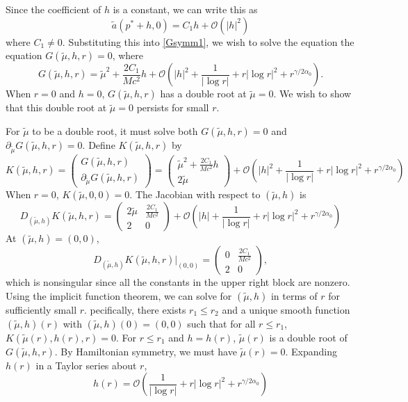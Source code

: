 \documentclass[thesis.tex]{subfiles}
\begin{document}
Since the coefficient of $h$ is a constant, we can write this as
\[
\tilde{a}(p^* + h, 0) = C_1 h + \mathcal{O}(|h|^2) 
\]
where $C_1 \neq 0$. Substituting this into \cref{Gsymm1}, we wish to solve the equation the equation $G(\tilde{\mu}, h, r) = 0$, where
\begin{equation}\label{Gsymm1}
G(\tilde{\mu}, h, r) = \tilde{\mu}^2 + \frac{2C_1}{M c^2}h + \mathcal{O}\left( |h|^2 + \frac{1}{|\log r|} + r |\log r|^2 + r^{\gamma/2\alpha_0} \right).
\end{equation}
When $r = 0$ and $h = 0$, $G(\tilde{\mu}, h, r)$ has a double root at $\tilde{\mu} = 0$. We wish to show that this double root at $\tilde{\mu} = 0$ persists for small $r$.

For $\tilde{\mu}$ to be a double root, it must solve both $G(\tilde{\mu}, h, r) = 0$ and $\partial_{\tilde{\mu}} G(\tilde{\mu}, h, r) = 0$. Define $K(\tilde{\mu}, h, r)$ by
\begin{equation}
K(\tilde{\mu}, h, r) = 
\begin{pmatrix}G(\tilde{\mu}, h, r) \\ \partial_{\tilde{\mu}}G(\tilde{\mu}, h, r) \end{pmatrix} 
= \begin{pmatrix}
\tilde{\mu}^2 + \frac{2C_1}{M c^2}h \\
2 \tilde{\mu}
\end{pmatrix}
+ \mathcal{O}\left( |h|^2 + \frac{1}{|\log r|} + r |\log r|^2 + r^{\gamma/2\alpha_0} \right)
\end{equation}
When $r = 0$, $K(\tilde{\mu}, 0, 0) = 0$. The Jacobian with respect to $(\tilde{\mu}, h)$ is
\[
D_{(\tilde{\mu}, h)}K(\tilde{\mu}, h, r) = 
\begin{pmatrix}
2 \tilde{\mu} & \frac{2C_1}{M c^2} \\
2 & 0
\end{pmatrix}
+ \mathcal{O}\left( |h| + \frac{1}{|\log r|} + r |\log r|^2 + r^{\gamma/2\alpha_0} \right)
\]
At $(\tilde{\mu}, h) = (0,0)$, 
\[
D_{(\tilde{\mu}, h)}K(\tilde{\mu}, h, r)\Big|_{(0,0)} = 
\begin{pmatrix}
0 & \frac{2C_1}{M c^2} \\
2 & 0
\end{pmatrix},
\]
which is nonsingular since all the constants in the upper right block are nonzero. Using the implicit function theorem, we can solve for $(\tilde{\mu}, h)$ in terms of $r$ for sufficiently small $r$. pecifically, there exists $r_1 \leq r_2$ and a unique smooth function $(\tilde{\mu}, h)(r)$ with $(\tilde{\mu}, h)(0) = (0, 0)$ such that for all $r \leq r_1$, $K(\tilde{\mu}(r), h(r), r) = 0$. For $r \leq r_1$ and $h = h(r)$, $\tilde{\mu}(r)$ is a double root of $G(\tilde{\mu}, h, r)$. By Hamiltonian symmetry, we must have $\tilde{\mu}(r) = 0$. Expanding $h(r)$ in a Taylor series about $r$, 
\begin{equation*}
h(r) = \mathcal{O}\left( \frac{1}{|\log r|} + r |\log r|^2 + r^{\gamma/2\alpha_0} \right)
\end{equation*}
\end{document}
